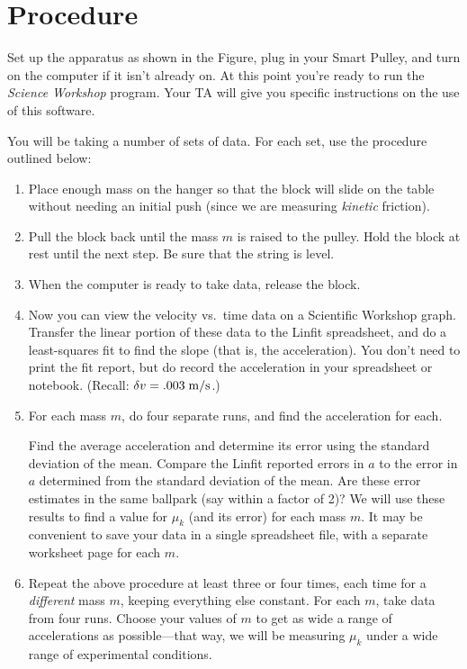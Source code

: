 \section*{Procedure}
Set up the apparatus as shown in the Figure, plug in your Smart
Pulley, and turn on the computer if it isn't already on.  At this
point you're ready to run the {\em Science Workshop} program.  Your TA
will give you specific instructions on the use of this software.

You will be taking a number of sets of data.  For each set, use the
procedure outlined below:

\begin{enumerate}
%
\item Place enough mass on the hanger so that the block will slide
on the table without needing an initial push (since we are measuring
{\em kinetic} friction).
%
\item Pull the block back until the mass $m$ is raised to the pulley.
Hold the block at rest until the next step.   Be sure that the string
is level.
%
\item  When the computer is ready to take data, release the block.
%
\item Now you can view the velocity vs.\ time data on a
Scientific Workshop graph.  Transfer the linear portion of these data
to the Linfit spreadsheet, and do a least-squares fit to find
the slope (that is, the acceleration).  You don't need to print the
fit report, but do record the acceleration in your spreadsheet or notebook.
(Recall: $\delta v = .003\; {\rm m/s}$.)
%
\item For each mass $m$, do four separate runs, and find the
acceleration for each.  

Find the average acceleration and determine
its error using the standard deviation of the mean. Compare the
Linfit reported errors in $a$ to the error in $a$ determined from
the standard deviation of the mean.  Are these error estimates
in the same ballpark (say within a factor of 2)? We will
use these results to find a value for $\mu_k$ (and its error)
for each mass $m$.  It may be convenient to save
your data in a single spreadsheet file, with a separate worksheet page
for each $m$.
%
\item Repeat the above procedure at least three or four times, each
time for a {\em different} mass $m$, keeping everything else constant.
For
each $m$, take data from four runs.  Choose your values of $m$ to get
as wide a range of accelerations as possible---that way, we will be
measuring $\mu_k$ under a wide range of experimental conditions.
%
\end{enumerate}

